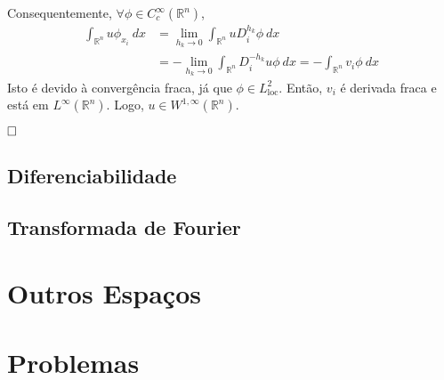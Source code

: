 \documentclass[a4paper, 11pt]{article}
\newcommand{\qed}{$\hfill\square$}
\newcommand{\rn}{{\mathbb{R}^n}}
\begin{document}
\begin{enumerate}
	Consequentemente, $\forall \phi \in C^\infty_c(\rn)$,\begin{align*}
		\int_\rn u \phi_{x_i}\ dx &= \lim_{h_k\rightarrow 0}\int_\rn u D_i^{h_k}\phi \ dx \\
		&= - \lim_{h_k\rightarrow 0} \int_\rn D_i^{-h_k}u\phi \ dx = - \int_\rn v_i \phi \ dx
	\end{align*}
	Isto é devido à convergência fraca, já que $\phi \in L^2_{\text{loc}}$. Então, $v_i$ é derivada fraca e está em $L^\infty(\rn)$. Logo, $u \in W^{1,\infty}(\rn)$.
	
	\qed
\end{enumerate}



\subsection{Diferenciabilidade}



\subsection{Transformada de Fourier}






\section{Outros Espaços}

\section{Problemas}
\end{document}
